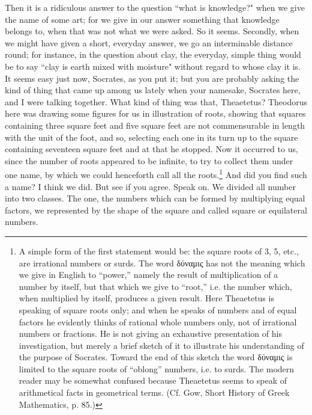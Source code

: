 \documentclass[letterpaper,12pt]{article}
\newcommand{\textgreek}[1]{\begingroup\fontencoding{LGR}\selectfont#1\endgroup}
\newcommand{\stephpag}[1]{\marginnote{\small\itshape\fontfamily{ppl}\selectfont #1}}
\begin{document}
\begin{drama}
Then it is a ridiculous answer to the question ``what is knowledge?" when we give the name of some art; \stephpag{c} for we give in our answer something that knowledge belongs to, when that was not what we were asked.
\theaetetusspeaks
So it seems.
\socratesspeaks
Secondly, when we might have given a short, everyday answer, we go an interminable distance round; for instance, in the question about clay, the everyday, simple thing would be to say ``clay is earth mixed with moisture" without regard to whose clay it is.
\theaetetusspeaks
It seems easy just now, Socrates, as you put it; but you are probably asking the kind of thing that came up among us lately when \stephpag{d} your namesake, Socrates here, and I were talking together.
\socratesspeaks
What kind of thing was that, Theaetetus?
\theaetetusspeaks
Theodorus here was drawing some figures for us in illustration of roots, showing that squares containing three square feet and five square feet are not commensurable in length with the unit of the foot, and so, selecting each one in its turn up to the square containing seventeen square feet and at that he stopped. Now it occurred to us, since the number of roots appeared to be infinite, to try to collect them under one name, \stephpag{e} by which we could henceforth call all the roots.\footnote{A simple form of the first statement would be: the square roots of 3, 5, etc., are irrational numbers or surds. The word \textgreek{δύναμις} has not the meaning which we give in English to ``power,'' namely the result of multiplication of a number by itself, but that which we give to ``root,'' i.e. the number which, when multiplied by itself, produces a given result. Here Theaetetus is speaking of square roots only; and when he speaks of numbers and of equal factors he evidently thinks of rational whole numbers only, not of irrational numbers or fractions. He is not giving an exhaustive presentation of his investigation, but merely a brief sketch of it to illustrate his understanding of the purpose of Socrates. Toward the end of this sketch the word \textgreek{δύναμις} is limited to the square roots of ``oblong'' numbers, i.e. to surds. The modern reader may be somewhat confused because Theaetetus seems to speak of arithmetical facts in geometrical terms. (Cf. Gow, Short History of Greek Mathematics, p. 85.)}
\socratesspeaks
And did you find such a name?
\theaetetusspeaks
I think we did. But see if you agree.
\socratesspeaks
Speak on.
\theaetetusspeaks
We divided all number into two classes. The one, the numbers which can be formed by multiplying equal factors, we represented by the shape of the square and called square or equilateral numbers.

\end{drama}
\end{document}
